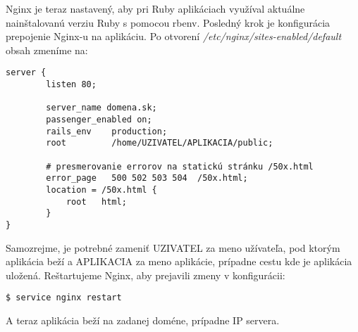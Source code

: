Nginx je teraz nastavený, aby pri Ruby aplikáciach využíval aktuálne nainštalovanú verziu Ruby s pomocou rbenv. Posledný krok je konfigurácia prepojenie Nginx-u na aplikáciu. Po otvorení \emph{/etc/nginx/sites-enabled/default} obsah zmeníme na:

\begin{verbatim}
server {
        listen 80;

        server_name domena.sk;
        passenger_enabled on;
        rails_env    production;
        root         /home/UZIVATEL/APLIKACIA/public;

        # presmerovanie errorov na statickú stránku /50x.html
        error_page   500 502 503 504  /50x.html;
        location = /50x.html {
            root   html;
        }
}
\end{verbatim}

Samozrejme, je potrebné zameniť UZIVATEL za meno užívateľa, pod ktorým aplikácia beží a APLIKACIA za meno aplikácie, prípadne cestu kde je aplikácia uložená. Reštartujeme Nginx, aby prejavili zmeny v konfigurácii:

\begin{verbatim}
$ service nginx restart
\end{verbatim}

A teraz aplikácia beží na zadanej doméne, prípadne IP servera.